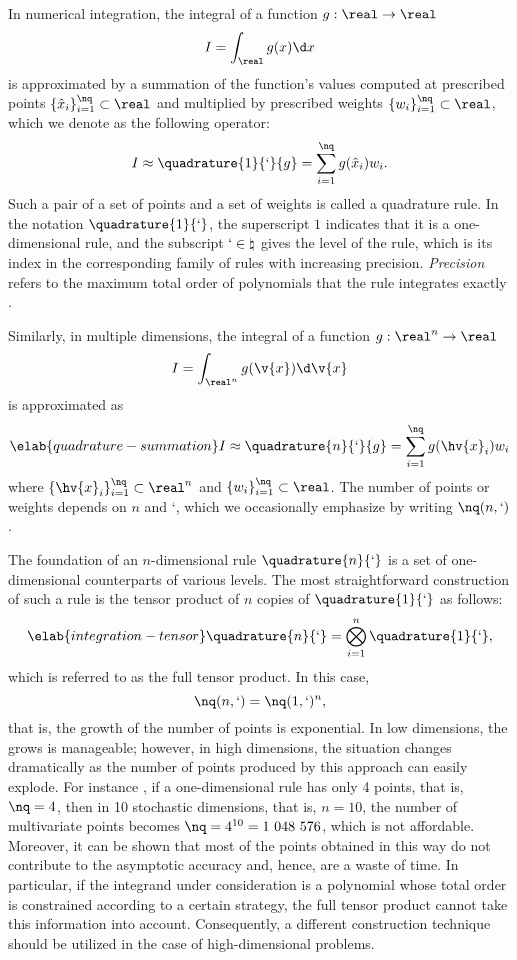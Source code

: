 In numerical integration, the integral of a function $g: \real \to \real$
\[
  I = \int_\real g(x) \d x
\]
is approximated by a summation of the function's values computed at prescribed
points $\{ \hat{x}_i \}_{i = 1}^\nq \subset \real$ and multiplied by prescribed
weights $\{ w_i \}_{i = 1}^\nq \subset \real$, which we denote as the following
operator:
\[
  I \approx \quadrature{1}{\lq}{g} = \sum_{i = 1}^\nq g(\hat{x}_i) w_i.
\]
Such a pair of a set of points and a set of weights is called a quadrature rule.
In the notation $\quadrature{1}{\lq}$, the superscript $1$ indicates that it is
a one-dimensional rule, and the subscript $\lq \in \natural$ gives the level of
the rule, which is its index in the corresponding family of rules with
increasing precision. \emph{Precision} refers to the maximum total order of
polynomials that the rule integrates exactly \cite{heiss2008}.

Similarly, in multiple dimensions, the integral of a function $g: \real^n \to
\real$
\[
  I = \int_{\real^n} g(\v{x}) \d \v{x}
\]
is approximated as
\begin{equation} \elab{quadrature-summation}
  I \approx \quadrature{n}{\lq}{g} = \sum_{i = 1}^\nq g(\hv{x}_i) w_i
\end{equation}
where $\{ \hv{x}_i \}_{i = 1}^\nq \subset \real^n$ and $\{ w_i \}_{i = 1}^\nq
\subset \real$. The number of points or weights \nq depends on $n$ and \lq,
which we occasionally emphasize by writing $\nq(n, \lq)$.

The foundation of an $n$-dimensional rule $\quadrature{n}{\lq}$ is a set of
one-dimensional counterparts of various levels. The most straightforward
construction of such a rule is the tensor product of $n$ copies of
$\quadrature{1}{\lq}$ as follows:
\begin{equation} \elab{integration-tensor}
  \quadrature{n}{\lq} = \bigotimes_{i = 1}^n \quadrature{1}{\lq},
\end{equation}
which is referred to as the full tensor product. In this case,
\[
  \nq(n, \lq) = \nq(1, \lq)^n,
\]
that is, the growth of the number of points is exponential. In low dimensions,
the grows is manageable; however, in high dimensions, the situation changes
dramatically as the number of points produced by this approach can easily
explode. For instance \cite{heiss2008}, if a one-dimensional rule has only 4
points, that is, $\nq = 4$, then in 10 stochastic dimensions, that is, $n = 10$,
the number of multivariate points becomes $\nq = 4^{10} = 1~048~576$, which is
not affordable. Moreover, it can be shown that most of the points obtained in
this way do not contribute to the asymptotic accuracy and, hence, are a waste of
time. In particular, if the integrand under consideration is a polynomial whose
total order is constrained according to a certain strategy, the full tensor
product cannot take this information into account. Consequently, a different
construction technique should be utilized in the case of high-dimensional
problems.

